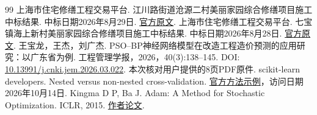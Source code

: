 \documentclass[UTF8,11pt,fontset=windows]{ctexart}
\begin{document}
\begin{thebibliography}{99}
 上海市住宅修缮工程交易平台. 江川路街道沧源二村美丽家园综合修缮项目施工中标结果. 中标日期2026年8月29日. \href{https://xsjypt.fgj.sh.gov.cn/cebea-bid-result!view.do?packageId=5fcd587e-411f-4617-9112-cf75a4b99372}{官方原文}.
 上海市住宅修缮工程交易平台. 七宝镇海上新村美丽家园综合修缮项目施工中标结果. 中标日期2026年8月28日. \href{https://xsjypt.fgj.sh.gov.cn/cebea-bid-result!view.do?packageId=edc6719e-876e-4613-9879-e03a5cc8084d}{官方原文}.
 王宝龙，王杰，刘广杰. PSO--BP神经网络模型在改造工程造价预测的应用研究：以广东省为例. 工程管理学报，2026，40(3):138--145. DOI: \href{https://doi.org/10.13991/j.cnki.jem.2026.03.022}{10.13991/j.cnki.jem.2026.03.022}. 本次核对用户提供的8页PDF原件.
 scikit-learn developers. Nested versus non-nested cross-validation. \href{https://scikit-learn.org/stable/auto_examples/model_selection/plot_nested_cross_validation_iris.html}{官方方法示例}，访问日期2026年10月14日.
 Kingma D P, Ba J. Adam: A Method for Stochastic Optimization. ICLR, 2015. \href{https://arxiv.org/abs/1412.6980}{作者论文}.
\end{thebibliography}
\end{document}
